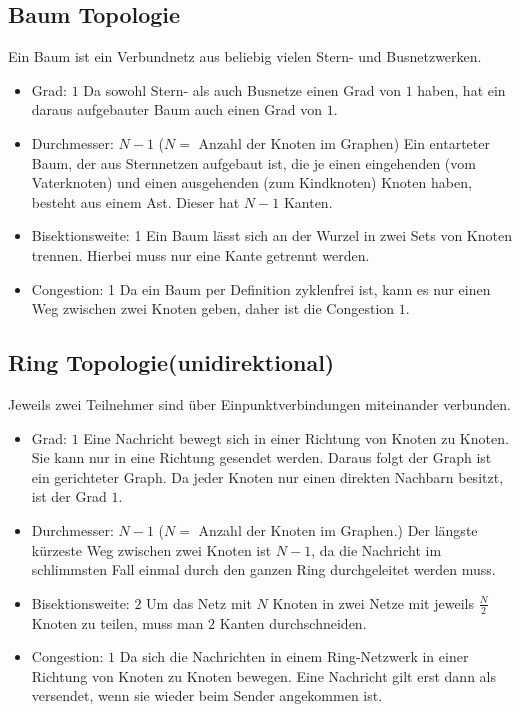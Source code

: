 \subsection{Baum Topologie}
Ein Baum ist ein Verbundnetz aus beliebig vielen Stern- und Busnetzwerken.
\begin{itemize}
  \item Grad: $1$
  \newline Da sowohl Stern- als auch Busnetze einen Grad von $1$ haben, hat ein
  daraus aufgebauter Baum auch einen Grad von $1$.
  \item Durchmesser: $N-1$ ($N =$ Anzahl der Knoten im Graphen)
   \newline Ein entarteter Baum, der aus Sternnetzen aufgebaut ist, die je einen
   eingehenden (vom Vaterknoten) und einen ausgehenden (zum Kindknoten) Knoten
   haben, besteht aus einem Ast. Dieser hat $N-1$ Kanten.
  \item Bisektionsweite: 1
  \newline Ein Baum lässt sich an der Wurzel in zwei Sets von Knoten trennen.
  Hierbei muss nur eine Kante getrennt werden.
  \item Congestion: 1
  \newline Da ein Baum per Definition zyklenfrei ist, kann es nur einen Weg
  zwischen zwei Knoten geben, daher ist die Congestion $1$.
\end{itemize}

\subsection{Ring Topologie(unidirektional)}
 Jeweils zwei Teilnehmer sind über Einpunktverbindungen miteinander verbunden.
\begin{itemize}
  \item Grad: $1$
  \newline Eine Nachricht bewegt sich in einer Richtung von Knoten zu Knoten. 
  Sie kann nur in eine Richtung gesendet werden. Daraus folgt der Graph ist ein
  gerichteter Graph. Da jeder Knoten nur einen direkten Nachbarn besitzt, ist
  der Grad $1$.
  \item Durchmesser: $N-1$ ($N =$ Anzahl der Knoten im Graphen.)
   \newline Der längste kürzeste Weg zwischen zwei Knoten ist $N-1$, da die
   Nachricht im schlimmsten Fall einmal durch den ganzen Ring durchgeleitet werden muss.
  \item Bisektionsweite: $2$
  \newline  Um das Netz mit $N$ Knoten in zwei Netze mit jeweils $\frac{N}{2}$
  Knoten zu teilen, muss man $2$ Kanten durchschneiden.
  \item Congestion: $1$
  \newline Da sich die Nachrichten in einem Ring-Netzwerk in einer Richtung von
  Knoten zu Knoten bewegen. Eine Nachricht gilt erst dann als versendet, wenn
  sie wieder beim Sender angekommen ist.
\end{itemize}


